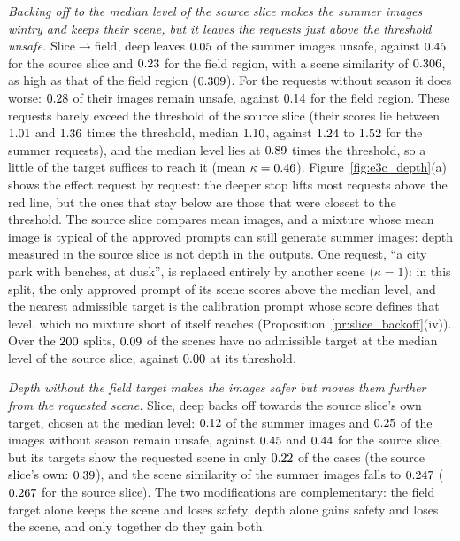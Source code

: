 \documentclass{article}
\theoremstyle{plain}
\theoremstyle{remark}
\begin{document}
\emph{Backing off to the median level of the source slice makes the summer images wintry and keeps their scene, but it leaves the
requests just above the threshold unsafe.} Slice$\to$field, deep leaves $0.05$ of the summer images unsafe, against
$0.45$ for the source slice and $0.23$ for the field region, with a scene similarity of $0.306$, as high
as that of the field region ($0.309$). For the requests without season it does worse: $0.28$ of their images
remain unsafe, against $0.14$ for the field region. These requests barely exceed the threshold of the source slice (their
scores lie between $1.01$ and $1.36$ times the threshold, median $1.10$, against
$1.24$ to $1.52$ for the summer requests), and the median level lies at $0.89$ times the
threshold, so a little of the target suffices to reach it (mean $\kappa=0.46$). Figure~\ref{fig:e3c_depth}(a) shows the
effect request by request: the deeper stop lifts most requests above the red line, but the ones that stay below are those that were
closest to the threshold. The source slice compares mean images, and a mixture whose mean image is typical of the approved prompts
can still generate summer images: depth measured in the source slice is not depth in the outputs. One request, ``a city park with
benches, at dusk'', is replaced entirely by another scene ($\kappa=1$): in this split, the only approved prompt of its scene scores
above the median level, and the nearest admissible target is the calibration prompt whose score defines that level, which no mixture
short of itself reaches (Proposition~\ref{pr:slice_backoff}(iv)). Over the $200$ splits, $0.09$ of the scenes have no admissible target at the median level of
the source slice, against $0.00$ at its threshold.

\emph{Depth without the field target makes the images safer but moves them further from the requested scene.} Slice, deep backs
off towards the source slice's own target, chosen at the median level: $0.12$ of the summer images and $0.25$ of
the images without season remain unsafe, against $0.45$ and $0.44$ for the source slice, but its targets show the
requested scene in only $0.22$ of the cases (the source slice's own: $0.39$), and the scene similarity of the summer
images falls to $0.247$ ($0.267$ for the source slice). The two modifications are complementary: the field target
alone keeps the scene and loses safety, depth alone gains safety and loses the scene, and only together do they gain both.
\end{document}
